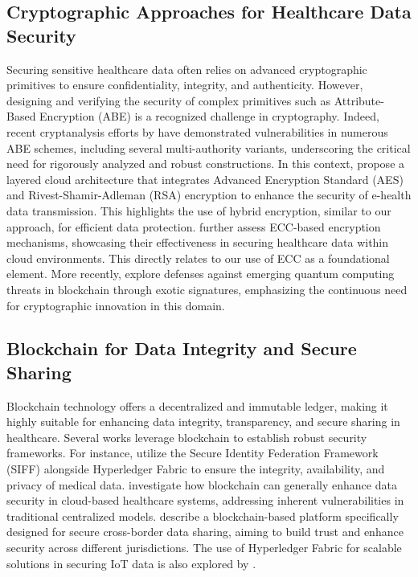 \documentclass[cic,tc,english]{iiufrgs}
\begin{document}
        \subsection{Cryptographic Approaches for Healthcare Data Security}
            Securing sensitive healthcare data often relies on advanced cryptographic primitives to ensure confidentiality, integrity, and authenticity. However, designing and verifying the security of complex primitives such as Attribute-Based Encryption (ABE) is a recognized challenge in cryptography. Indeed, recent cryptanalysis efforts by \citet{broken2020} have demonstrated vulnerabilities in numerous ABE schemes, including several multi-authority variants, underscoring the critical need for rigorously analyzed and robust constructions. In this context, \citet{Memos2021} propose a layered cloud architecture that integrates Advanced Encryption Standard (AES) and Rivest-Shamir-Adleman (RSA) encryption to enhance the security of e-health data transmission. This highlights the use of hybrid encryption, similar to our approach, for efficient data protection. \citet{Hema2019} further assess ECC-based encryption mechanisms, showcasing their effectiveness in securing healthcare data within cloud environments. This directly relates to our use of ECC as a foundational element. More recently, \citet{Naz2024} explore defenses against emerging quantum computing threats in blockchain through exotic signatures, emphasizing the continuous need for cryptographic innovation in this domain.


        \subsection{Blockchain for Data Integrity and Secure Sharing}
            Blockchain technology offers a decentralized and immutable ledger, making it highly suitable for enhancing data integrity, transparency, and secure sharing in healthcare. Several works leverage blockchain to establish robust security frameworks. For instance, \citet{Tian2019} utilize the Secure Identity Federation Framework (SIFF) alongside Hyperledger Fabric to ensure the integrity, availability, and privacy of medical data. \citet{Esposito2018} investigate how blockchain can generally enhance data security in cloud-based healthcare systems, addressing inherent vulnerabilities in traditional centralized models. \citet{Rahman2020} describe a blockchain-based platform specifically designed for secure cross-border data sharing, aiming to build trust and enhance security across different jurisdictions. The use of Hyperledger Fabric for scalable solutions in securing IoT data is also explored by \citet{Eghmazi2024}.
    
\end{document}
